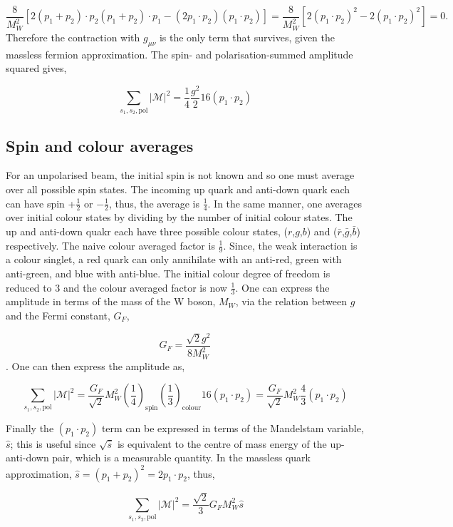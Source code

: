 \documentclass[a4paper,11pt]{article}
\begin{document}
$$\frac{8}{M_W^2}[2(p_1 + p_2) \cdot p_2 (p_1 +p_2 )\cdot p_1 - (2p_1\cdot p_2)(p_1 \cdot p_2)]  = \frac{8}{M_W^2}[2(p_1 \cdot p_2)^2 - 2(p_1 \cdot p_2)^2] = 0.$$	
Therefore the contraction with $g_{\mu\nu}$ is the only term that survives, given the massless fermion approximation. The spin- and  polarisation-summed amplitude squared gives,


\begin{equation}\label{spin_pol_square_amp2}
	\sum_{s_1, s_2, \text{pol}} |\mathcal{M}|^2= \frac{1}{4} \frac{g^2}{2}16(p_1 \cdot p_2)
\end{equation}

\subsection{Spin and colour averages}
For an unpolarised beam, the initial spin is not known and so one must average over all possible spin states. The incoming up quark and anti-down quark each can have spin +$\frac{1}{2}$ or $-\frac{1}{2}$, thus, the average is $\frac{1}{4}$. In the same manner, one averages over initial colour states by dividing by the number of initial colour states.  The up and anti-down quakr each have three possible colour states, ($r$,$g$,$b$) and ($\bar{r}$,$\bar{g}$,$\bar{b}$) respectively. The naive colour averaged factor is $\frac{1}{9}$. Since, the weak interaction is a colour singlet, a red quark can only annihilate with an anti-red, green with anti-green, and blue with anti-blue. The initial colour degree of freedom is reduced to 3 and the colour averaged factor is now $\frac{1}{3}$. One can express the amplitude in terms of the mass of the W boson, $M_W$, via the relation between $g$ and the Fermi constant, $G_F$,

$$G_F = \frac{\sqrt{2} g^2}{8M_W^2}$$. One can then express the amplitude as,


$$\sum_{s_1, s_2, \text{pol}} |\mathcal{M}|^2=  \frac{G_F}{\sqrt{2}} M_W^2 \left(\frac{1}{4}\right)_{\text{spin}}\left(\frac{1}{3}\right)_{\text{colour}}16(p_1 \cdot p_2)  =  \frac{G_F}{\sqrt{2}} M_W^2 \frac{4}{3}(p_1 \cdot p_2) $$

Finally the $(p_1 \cdot p_2)$ term can be expressed in terms of the Mandelstam variable, $\hat{s}$; this is useful since $\sqrt{\hat{s}}$ is equivalent to the centre of mass energy of the up-anti-down pair, which is a measurable quantity. In the massless quark approximation,  $\hat{s} = (p_1+p_2)^2 = 2p_1 \cdot p_2$, thus, 

\begin{equation}\label{amp}
	\sum_{s_1, s_2, \text{pol}} |\mathcal{M}|^2= \frac{\sqrt{2}}{3}G_F M_W^2 \hat{s}
\end{equation}
\end{document}
